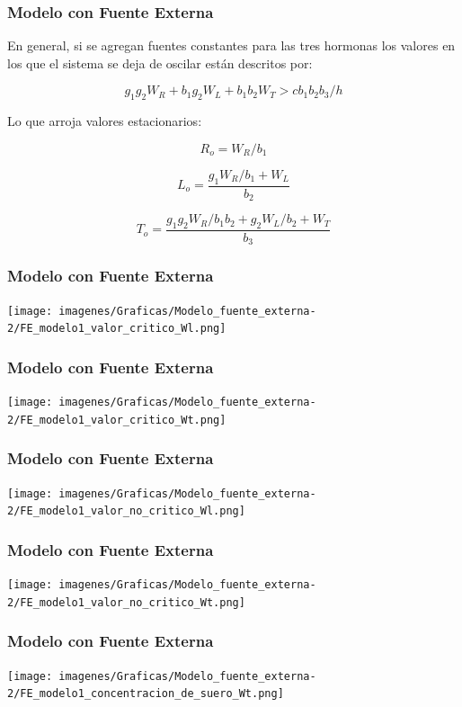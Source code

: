 \documentclass[10pt]{beamer}
\begin{document}
\begin{frame}
\frametitle{Modelo con Fuente Externa}
En general, si se agregan fuentes constantes para las tres hormonas los valores en los que el sistema se deja de oscilar están descritos por:

$$ g_{1} g_{2} W_{R} + b_{1} g_{2} W_{L} + b_{1} b_{2} W_{T} > c b_{1} b_{2} b_{3} / h $$

Lo que arroja valores estacionarios:

$$ R_{o} = W_{R}/b_{1} $$

$$ L_{o} = \frac{g_{1} W_{R}/ b_{1} + W_{L}}{b_{2}}$$

$$ T_{o} = \dfrac{g_{1} g_{2} W_{R}/ b_{1} b_{2} + g_{2} W_{L}/b_{2} + W_{T}}{b_{3}}  $$


\end{frame}

\begin{frame}
\frametitle{Modelo con Fuente Externa}
\begin{center}
 \texttt{[image: imagenes/Graficas/Modelo\_fuente\_externa-2/FE\_modelo1\_valor\_critico\_Wl.png]}
\end{center}
\end{frame}


\begin{frame}
\frametitle{Modelo con Fuente Externa}
\begin{center}
 \texttt{[image: imagenes/Graficas/Modelo\_fuente\_externa-2/FE\_modelo1\_valor\_critico\_Wt.png]}
\end{center}
\end{frame}

\begin{frame}
\frametitle{Modelo con Fuente Externa}
\begin{center}
 \texttt{[image: imagenes/Graficas/Modelo\_fuente\_externa-2/FE\_modelo1\_valor\_no\_critico\_Wl.png]}
\end{center}
\end{frame}


\begin{frame}
\frametitle{Modelo con Fuente Externa}
\begin{center}
 \texttt{[image: imagenes/Graficas/Modelo\_fuente\_externa-2/FE\_modelo1\_valor\_no\_critico\_Wt.png]}
\end{center}
\end{frame}


\begin{frame}
\frametitle{Modelo con Fuente Externa}
\begin{center}
 \texttt{[image: imagenes/Graficas/Modelo\_fuente\_externa-2/FE\_modelo1\_concentracion\_de\_suero\_Wt.png]}
\end{center}
\end{frame}
\end{document}
